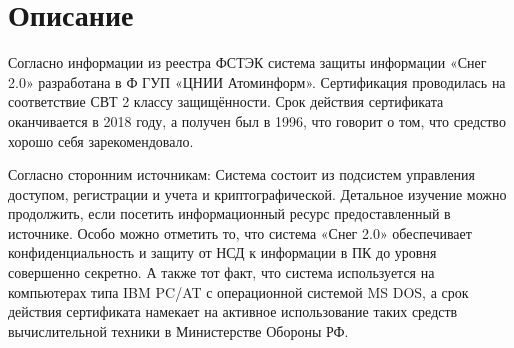 \section{Описание}
Согласно информации из реестра ФСТЭК система защиты информации  «Снег 2.0» разработана в Ф ГУП «ЦНИИ Атоминформ».\cite{FSTECreestr}
Сертификация проводилась на соответствие СВТ 2 классу защищённости.
Срок действия сертификата оканчивается в 2018 году, а получен был в 1996, что говорит о том, что средство хорошо себя зарекомендовало.

Согласно сторонним источникам\cite{bezopasnik}:
Система состоит из подсистем управления доступом, регистрации и учета и криптографической.
Детальное изучение можно продолжить, если посетить информационный ресурс предоставленный в источнике.
Особо можно отметить то, что система «Снег 2.0» обеспечивает конфиденциальность и защиту от НСД к информации в ПК до уровня совершенно секретно.
А также тот факт, что система используется на компьютерах типа IBM PC/AT с операционной системой MS DOS,
а срок действия сертификата намекает на активное использование таких средств вычислительной техники в Министерстве Обороны РФ.
\cite{all-ib}
